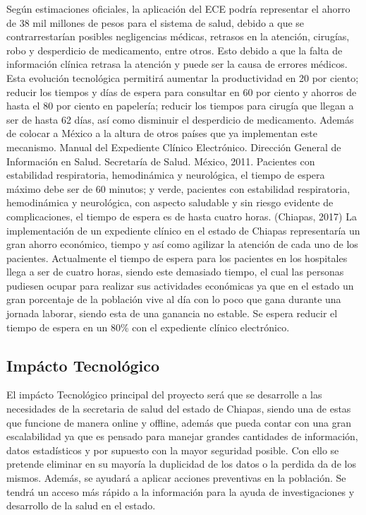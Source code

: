 Según estimaciones oficiales, la aplicación del ECE podría representar el ahorro de 38 mil millones de pesos para el sistema de salud, debido a que se contrarrestarían posibles negligencias médicas, retrasos en la atención, cirugías, robo y desperdicio de medicamento, entre otros. Esto debido a que la falta de información clínica retrasa la atención y puede ser la causa de errores médicos. Esta evolución tecnológica permitirá aumentar la productividad en 20 por ciento; reducir los tiempos y días de espera para consultar en 60 por ciento y ahorros de hasta el 80 por ciento en papelería; reducir los tiempos para cirugía que llegan a ser de hasta 62 días, así como disminuir el desperdicio de medicamento. Además de colocar a México a la altura de otros países que ya implementan este mecanismo. Manual del Expediente Clínico Electrónico. Dirección General de Información en Salud. Secretaría de Salud. México, 2011.
Pacientes con estabilidad respiratoria, hemodinámica y neurológica, el tiempo de espera máximo debe ser de 60 minutos; y verde, pacientes con estabilidad respiratoria, hemodinámica y neurológica, con aspecto saludable y sin riesgo evidente de complicaciones, el tiempo de espera es de hasta cuatro horas. (Chiapas, 2017)
La implementación de un expediente clínico en el estado de Chiapas representaría un gran ahorro económico, tiempo y así como agilizar la atención de cada uno de los pacientes. Actualmente el tiempo de espera para los pacientes en los hospitales llega a ser de cuatro horas, siendo este demasiado tiempo, el cual las personas pudiesen ocupar para realizar sus actividades económicas ya que en el estado un gran porcentaje de la población vive al día con lo poco que gana durante una jornada laborar, siendo esta de una ganancia no estable. Se espera reducir el tiempo de espera en un 80\% con el expediente clínico electrónico.

\subsection{Impácto Tecnológico}
El impácto Tecnológico principal del proyecto será que se desarrolle a las necesidades de la secretaria de salud del estado de Chiapas, siendo una de estas que funcione de manera online y offline, además que pueda contar con una gran escalabilidad ya que es pensado para manejar grandes cantidades de información, datos estadísticos y por supuesto con la mayor seguridad posible.  Con ello se pretende eliminar en su mayoría la duplicidad de los datos o la perdida da de los mismos. Además, se ayudará a aplicar acciones preventivas en la población. Se tendrá un acceso más rápido a la información para la ayuda de investigaciones y desarrollo de la salud en el estado.

